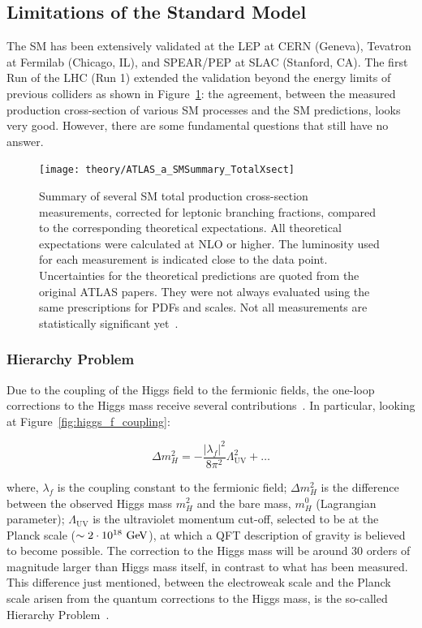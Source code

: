 		\subsection{Limitations of the Standard Model}
		\label{sec:SMlim}

			The \ac{SM} has been extensively validated at the \ac{LEP} at CERN (Geneva), Tevatron at Fermilab (Chicago, IL), and SPEAR/PEP at SLAC (Stanford, CA). The first Run of the \acs{LHC} (Run 1) extended the validation beyond the energy limits of previous colliders as shown in Figure~\ref{fig:ATLAS_a_SMSummary_TotalXsect}: the agreement, between the measured production cross-section of various \ac{SM} processes and the \ac{SM} predictions, looks very good. However, there are some fundamental questions that still have no answer.

			\begin{figure}[!htb]
				\centering
				\texttt{[image: theory/ATLAS\_a\_SMSummary\_TotalXsect]}
				\caption{\label{fig:ATLAS_a_SMSummary_TotalXsect} Summary of several \ac{SM} total production cross-section measurements, corrected for leptonic branching fractions, compared to the corresponding theoretical expectations. All theoretical expectations were calculated at NLO or higher. The luminosity used for each measurement is indicated close to the data point. Uncertainties for the theoretical predictions are quoted from the original ATLAS papers. They were not always evaluated using the same prescriptions for PDFs and scales. Not all measurements are statistically significant yet~\cite{ATLAS_a_SMSummary_TotalXsect}.}
			\end{figure}



		\subsubsection*{Hierarchy Problem}

			Due to the coupling of the Higgs field to the fermionic fields, the one-loop corrections to the Higgs mass receive several contributions~\cite{Weinberg1976}. In particular, looking at Figure~\ref{fig:higgs_f_coupling}: 

			\begin{equation}
				\label{eq:mH_fermionic_contribution}
				\Delta m_H^2 = - \frac{ | \lambda_f  |^2}{8 \pi ^2} \Lambda_{\mathrm{UV}}^2 + \dots 
			\end{equation}
 	
			\noindent where, $\lambda_f$ is the coupling constant to the fermionic field; $\Delta m_H^2$ is the difference between the observed Higgs mass $m_H^2$ and the bare mass, $m_H^0$ (Lagrangian parameter); $\Lambda_{\mathrm{UV}}$ is the ultraviolet momentum cut-off, selected to be at the Planck scale ($\sim 2 \cdot 10^{18} \gev$), at which a \ac{QFT} description of gravity is believed to become possible. The correction to the Higgs mass will be around 30 orders of magnitude larger than Higgs mass itself, in contrast to what has been measured. This difference just mentioned, between the electroweak scale and the Planck scale arisen from the quantum corrections to the Higgs mass, is the so-called Hierarchy Problem~\cite{Weinberg1976}.

